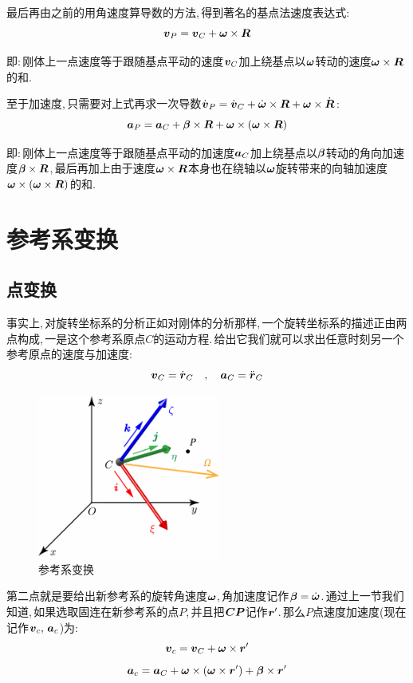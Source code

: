 最后再由之前的用角速度算导数的方法,\,得到著名的基点法速度表达式:
\[\boldsymbol{v}_{P}=\boldsymbol{v}_{C}+\boldsymbol{\omega}\times\boldsymbol{R}\]

即:\,刚体上一点速度等于跟随基点平动的速度$\boldsymbol{v}_{C}$加上绕基点以$\boldsymbol{\omega}$转动的速度$\boldsymbol{\omega}\times\boldsymbol{R}$的和.

至于加速度,\,只需要对上式再求一次导数$\dot{\boldsymbol{v}}_{P}=\dot{\boldsymbol{v}}_{C}+\dot{\boldsymbol{\omega}}\times\boldsymbol{R}+\boldsymbol{\omega}\times\dot{\boldsymbol{R}}$:
\[\boldsymbol{a}_{P}=\boldsymbol{a}_{C}+\boldsymbol{\beta}\times\boldsymbol{R}+\boldsymbol{\omega}\times(\boldsymbol{\omega}\times\boldsymbol{R})\]

即:\,刚体上一点速度等于跟随基点平动的加速度$\boldsymbol{a}_{C}$加上绕基点以$\boldsymbol{\beta}$转动的角向加速度$\boldsymbol{\beta}\times\boldsymbol{R}$,\,最后再加上由于速度$\boldsymbol{\omega}\times\boldsymbol{R}$本身也在绕轴以$\boldsymbol{\omega}$旋转带来的向轴加速度$\boldsymbol{\omega}\times(\boldsymbol{\omega}\times\boldsymbol{R})$的和.


\section{参考系变换}

\subsection{点变换}

事实上,\,对旋转坐标系的分析正如对刚体的分析那样,\,一个旋转坐标系的描述正由两点构成,\,一是这个参考系原点$C$的运动方程.\,给出它我们就可以求出任意时刻另一个参考原点的速度与加速度:
\[\boldsymbol{v}_C=\dot{\boldsymbol{r}}_C\quad,\quad \boldsymbol{a}_C=\ddot{\boldsymbol{r}}_C\]


\begin{figure}\label{6-1-10}
\vspace{-0.2cm}
\centering
\includegraphics[width=6cm]{image/6-1-10.png}
\caption{参考系变换}
\end{figure}
第二点就是要给出新参考系的旋转角速度$\boldsymbol{\omega}$,\,角加速度记作$\boldsymbol{\beta}=\dot{\boldsymbol{\omega}}$.\,通过上一节我们知道,\,如果选取固连在新参考系的点$P$,\,并且把$\boldsymbol{CP}$记作$\boldsymbol{r}'$.\,那么$P$点速度加速度(现在记作$\boldsymbol{v}_c,\,\boldsymbol{a}_c$)为:
\[\boldsymbol{v}_c=\boldsymbol{v}_C+\boldsymbol{\omega}\times \boldsymbol{r}'\]
\[\boldsymbol{a}_c=\boldsymbol{a}_C+\boldsymbol{\omega}\times (\boldsymbol{\omega}\times\boldsymbol{r}')+\boldsymbol{\beta}\times\boldsymbol{r}'\]

